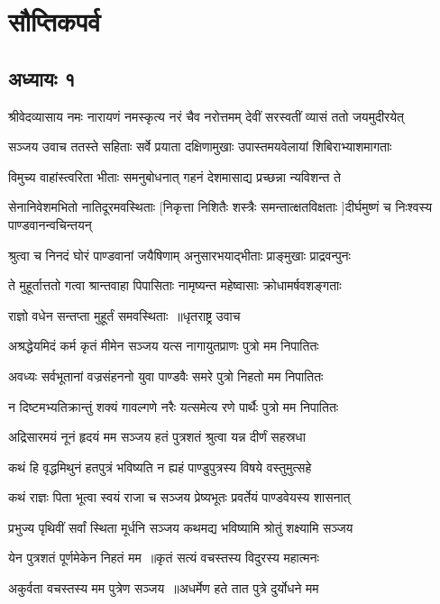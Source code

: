\part{सौप्तिकपर्व}
\chapter{अध्यायः १}
\threelineshloka
{श्रीवेदव्यासाय नमः}
{नारायणं नमस्कृत्य नरं चैव नरोत्तमम्}
{देवीं सरस्वतीं व्यासं ततो जयमुदीरयेत्}


\threelineshloka
{सञ्जय उवाच}
{ततस्ते सहिताः सर्वे प्रयाता दक्षिणामुखाः}
{उपास्तमयवेलायां शिबिराभ्याशमागताः}


\twolineshloka
{विमुच्य वाहांस्त्वरिता भीताः समनुबोधनात्}
{गहनं देशमासाद्य प्रच्छन्ना न्यविशन्त ते}


\threelineshloka
{सेनानिवेशमभितो नातिदूरमवस्थिताः}
{[निकृत्ता निशितैः शस्त्रैः समन्तात्क्षतविक्षताः}
{]दीर्घमुष्णं च निःश्वस्य पाण्डवानन्वचिन्तयन्}


\twolineshloka
{श्रुत्वा च निनदं घोरं पाण्डवानां जयैषिणाम्}
{अनुसारभयाद्भीताः प्राङ्मुखाः प्राद्रवन्पुनः}


\twolineshloka
{ते मुहूर्तात्ततो गत्वा श्रान्तवाहा पिपासिताः}
{नामृष्यन्त महेष्वासाः क्रोधामर्षवशङ्गताः}


\twolineshloka
{राज्ञो वधेन सन्तप्ता मुहूर्तं समवस्थिताः ॥धृतराष्ट्र उवाच}
{}


\twolineshloka
{अश्रद्धेयमिदं कर्म कृतं मीमेन सञ्जय}
{यत्स नागायुतप्राणः पुत्रो मम निपातितः}


\twolineshloka
{अवध्यः सर्वभूतानां वज्रसंहननो युवा}
{पाण्डवैः समरे पुत्रो निहतो मम निपातितः}


\twolineshloka
{न दिष्टमभ्यतिक्रान्तुं शक्यं गावल्गणे नरैः}
{यत्समेत्य रणे पार्थैः पुत्रो मम निपातितः}


\twolineshloka
{अद्रिसारमयं नूनं हृदयं मम सञ्जय}
{हतं पुत्रशतं श्रुत्वा यन्न दीर्णं सहस्रधा}


\twolineshloka
{कथं हि वृद्धमिथुनं हतपुत्रं भविष्यति}
{न ह्यहं पाण्डुपुत्रस्य विषये वस्तुमुत्सहे}


\twolineshloka
{कथं राज्ञः पिता भूत्वा स्वयं राजा च सञ्जय}
{प्रेष्यभूतः प्रवर्तेयं पाण्डवेयस्य शासनात्}


\threelineshloka
{प्रभुज्य पृथिवीं सर्वां स्थिता मूर्धनि सञ्जय}
{कथमद्य भविष्यामि श्रोतुं शक्ष्यामि सञ्जय}
{}


\twolineshloka
{येन पुत्रशतं पूर्णमेकेन निहतं मम ॥कृतं सत्यं वचस्तस्य विदुरस्य महात्मनः}
{}


\twolineshloka
{अकुर्वता वचस्तस्य मम पुत्रेण सञ्जय ॥अधर्मेण हते तात पुत्रे दुर्योधने मम}
{}


